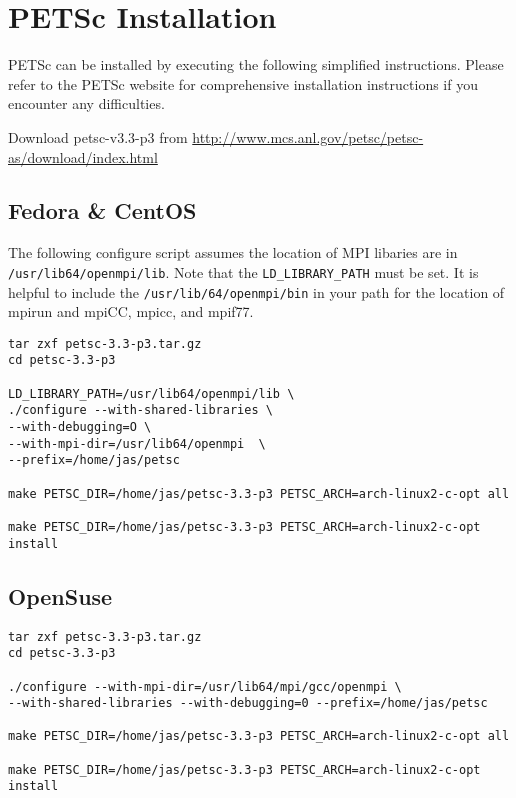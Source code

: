 \documentclass[11pt,fleqn]{book} %
\begin{document}
\chapter{PETSc Installation}

PETSc can be installed by executing the following simplified
instructions.  Please refer to the PETSc website for comprehensive
installation instructions if you encounter any difficulties.

Download petsc-v3.3-p3 from
\url{http://www.mcs.anl.gov/petsc/petsc-as/download/index.html}

\section{Fedora \& CentOS}

The following configure script assumes the location of MPI libaries
are in \texttt{/usr/lib64/openmpi/lib}.  Note that the
\texttt{LD\_LIBRARY\_PATH} must be set.  It is helpful to include the
\texttt{/usr/lib/64/openmpi/bin} in your path for the location of
mpirun and mpiCC, mpicc, and mpif77.

\begin{lstlisting}
tar zxf petsc-3.3-p3.tar.gz
cd petsc-3.3-p3

LD_LIBRARY_PATH=/usr/lib64/openmpi/lib \
./configure --with-shared-libraries \
--with-debugging=O \
--with-mpi-dir=/usr/lib64/openmpi  \
--prefix=/home/jas/petsc

make PETSC_DIR=/home/jas/petsc-3.3-p3 PETSC_ARCH=arch-linux2-c-opt all

make PETSC_DIR=/home/jas/petsc-3.3-p3 PETSC_ARCH=arch-linux2-c-opt install

\end{lstlisting}

\section{OpenSuse}

\begin{lstlisting}
tar zxf petsc-3.3-p3.tar.gz
cd petsc-3.3-p3

./configure --with-mpi-dir=/usr/lib64/mpi/gcc/openmpi \
--with-shared-libraries --with-debugging=0 --prefix=/home/jas/petsc

make PETSC_DIR=/home/jas/petsc-3.3-p3 PETSC_ARCH=arch-linux2-c-opt all

make PETSC_DIR=/home/jas/petsc-3.3-p3 PETSC_ARCH=arch-linux2-c-opt install

\end{lstlisting}
\end{document}
